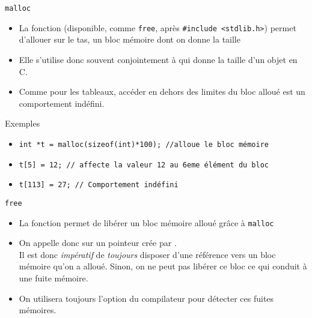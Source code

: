 \documentclass[10pt]{beamer}
\begin{document}
\begin{frame}[fragile]{\Ctitle}{\stitle}
	\begin{alertblock}{{\tt malloc}}
		\begin{itemize}
			\item<1-> La fonction  (disponible, comme {\tt free}, après \texttt{#include <stdlib.h>}) permet d'allouer sur le tas, un bloc mémoire dont on donne la taille
			\item<2-> Elle s'utilise donc souvent conjointement à  qui donne la taille d'un objet en C.
			\item<3-> Comme pour les tableaux, accéder en dehors des limites du bloc alloué est un comportement indéfini.
		\end{itemize}
	\end{alertblock}
	\begin{exampleblock}{Exemples}
		\begin{itemize}
		\item<4->\texttt{int *t =  malloc(sizeof(int)*100); //alloue le bloc mémoire}
		\item<5->\texttt{t[5] = 12; // affecte la valeur 12 au 6eme élément du bloc}
		\item<6->\texttt{t[113] = 27; // Comportement indéfini}
		\end{itemize}
	\end{exampleblock}
\end{frame}

\begin{frame}[fragile]{\Ctitle}{\stitle}
	\begin{alertblock}{{\tt free}}
		\begin{itemize}
			\item<1-> La fonction  permet de libérer un bloc mémoire alloué grâce à {\tt malloc}
			\item<2-> On appelle donc  sur un pointeur  crée  par . \\
			\textcolor{BrickRed}{\small \danger \;}{Il est donc \textit{impératif} de \textit{toujours} disposer d'une référence vers un bloc mémoire qu'on a alloué. Sinon, on ne peut pas libérer ce bloc ce qui conduit à une fuite mémoire.}
			\item<4-> On utilisera toujours l'option  du compilateur pour détecter ces fuites mémoires.
		\end{itemize}
	\end{alertblock}
\end{frame}
\end{document}
